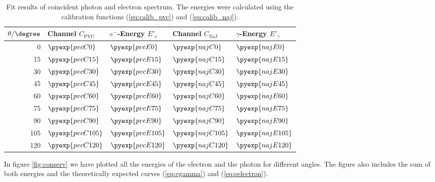 \begin{table}[htbp]
  \centering
  \begin{tabular}{r|ll|ll}
   $\theta/\degree$ & Channel $C_{\mathrm{PVC}}$ & $e^-$-Energy $E'_e$ & Channel $C_{\mathrm{NaJ}}$ & $\gamma$-Energy $E'_{\gamma}$ \\ \toprule[1.5pt]
  0 & $\pyexp{pvcC0}$ & $\pyexp{pvcE0}$ & $\pyexp{najC0}$ & $\pyexp{najE0}$ \\ 
  15 & $\pyexp{pvcC15}$ & $\pyexp{pvcE15}$ & $\pyexp{najC15}$ & $\pyexp{najE15}$ \\ 
  30 & $\pyexp{pvcC30}$ & $\pyexp{pvcE30}$ & $\pyexp{najC30}$ & $\pyexp{najE30}$ \\ 
  45 & $\pyexp{pvcC45}$ & $\pyexp{pvcE45}$ & $\pyexp{najC45}$ & $\pyexp{najE45}$ \\ 
  60 & $\pyexp{pvcC60}$ & $\pyexp{pvcE60}$ & $\pyexp{najC60}$ & $\pyexp{najE60}$ \\ 
  75 & $\pyexp{pvcC75}$ & $\pyexp{pvcE75}$ & $\pyexp{najC75}$ & $\pyexp{najE75}$ \\ 
  90 & $\pyexp{pvcC90}$ & $\pyexp{pvcE90}$ & $\pyexp{najC90}$ & $\pyexp{najE90}$ \\ 
  105 & $\pyexp{pvcC105}$ & $\pyexp{pvcE105}$ & $\pyexp{najC105}$ & $\pyexp{najE105}$ \\ 
  120 & $\pyexp{pvcC120}$ & $\pyexp{pvcE120}$ & $\pyexp{najC120}$ & $\pyexp{najE120}$ \\ \bottomrule[1.5pt]
  \end{tabular}
  \caption{Fit results of coincident photon and electron spectrum. The energies were calculated using the calibration functions (\ref{eq:calib_pvc}) and
  (\ref{eq:calib_naj}).}
  \label{tab:conserv}
\end{table}

In figure \ref{fig:conserv}  we have plotted all the energies of the
electron and the photon for different angles. The figure also includes the
sum of both energies and the theoretically expected curves (\ref{eq:egamma})
and (\ref{eq:eelectron}). 


